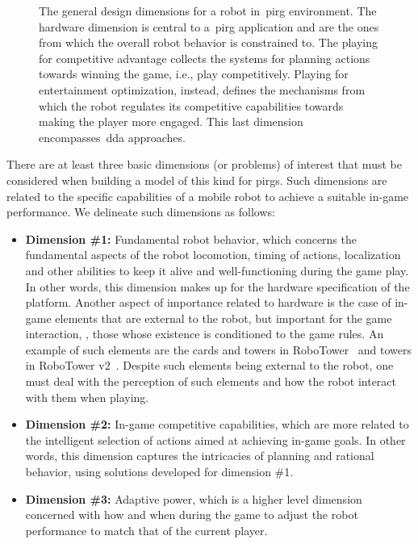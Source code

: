 \begin{figure}[h]
    \caption{The general design dimensions for a robot in~\gls{pirg} environment. The hardware dimension is central to a~\gls{pirg} application and are the ones from which the overall robot behavior is constrained to. The playing for competitive advantage collects the systems for planning actions towards winning the game, i.e., play competitively. Playing for entertainment optimization, instead, defines the mechanisms from which the robot regulates its competitive capabilities towards making the player more engaged. This last dimension encompasses~\glsdesc{dda} approaches.}
    \label{graph:PIRG_design_structure}
\end{figure}

There are at least three basic dimensions (or problems) of interest that must be considered when building a model of this kind for \gls{pirg}s. Such dimensions are related to the specific capabilities of a mobile robot to achieve a suitable in-game performance. We delineate such dimensions as follows:

\begin{itemize}[leftmargin=*,labelsep=5.8mm]
\item {\textbf{Dimension \#1:} Fundamental robot behavior}, which concerns the fundamental aspects of the robot locomotion, timing of actions, localization and other abilities to keep it alive and well-functioning during the game play. In other words, this dimension makes up for the hardware specification of the platform. Another aspect of importance related to hardware is the case of in-game elements that are external to the robot, but important for the game interaction, \ie, those whose existence is conditioned to the game rules. An example of such elements are the cards and towers in RoboTower~\citep{bonarini_timing_2014} and towers in RoboTower v2~\citep{oliveira_activity_2017}. Despite such elements being external to the robot, one must deal with the perception of such elements and how the robot interact with them when playing.
\item {\textbf{Dimension \#2:} In-game competitive capabilities}, which are more related to the intelligent selection of actions aimed at achieving in-game goals. In other words, this dimension captures the intricacies of planning and rational behavior, using solutions developed for dimension \#1.
\item {\textbf{Dimension \#3:} Adaptive power}, which is a higher level dimension concerned with how and when during the game to adjust the robot performance to match that of the current player.
\end{itemize}

